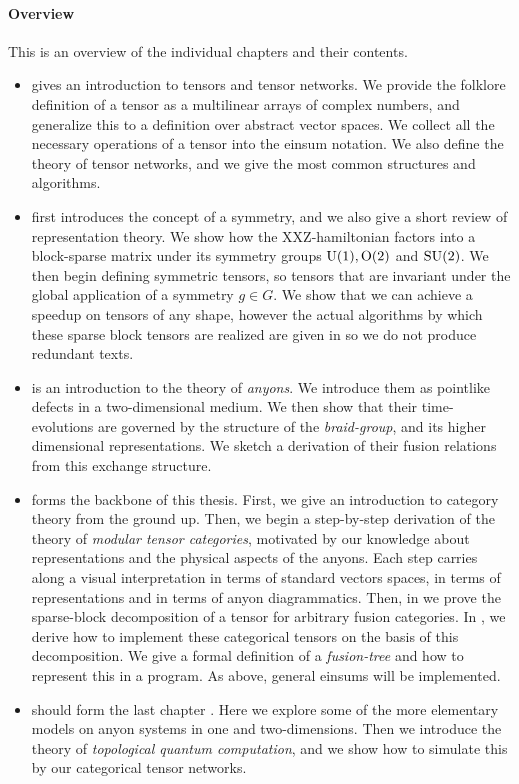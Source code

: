 \paragraph{Overview} This is an overview of the individual chapters and their contents.

\begin{itemize}
    \item {} gives an introduction to tensors and tensor
    networks. We provide the folklore definition of a tensor as a multilinear
    arrays of complex numbers, and generalize this to a definition over abstract
    vector spaces. We collect all the necessary operations of a tensor into the
    einsum notation. We also define the theory of tensor networks, and we give
    the most common structures and algorithms.
    \item {} first introduces the concept of a
    symmetry, and we also give a short review of representation theory. We show
    how the XXZ-hamiltonian factors into a block-sparse matrix under its
    symmetry groups $\mathrm{U}(1),\operatorname{O}(2)$ and $\mathrm{SU}(2)$. We then begin
    defining symmetric tensors, so tensors that are invariant under the global
    application of a symmetry $g \in G$. We show that we can achieve a speedup
    on tensors of any shape, however the actual algorithms by which these sparse
    block tensors are realized are given in  so we do not produce redundant texts.
    \item {} is an introduction to the theory of
    \emph{anyons}. We introduce them as pointlike defects in a two-dimensional
    medium. We then show that their time-evolutions are governed by the
    structure of the \emph{braid-group}, and its higher dimensional
    representations. We sketch a derivation of their fusion relations from this
    exchange structure. 
    \item {} forms the backbone of this thesis. First, we
    give an introduction to category theory from the ground up. Then, we begin a
    step-by-step derivation of the theory of \emph{modular tensor categories},
    motivated by our knowledge about representations and the physical aspects of
    the anyons. Each step carries along a visual interpretation in terms of
    standard vectors spaces, in terms of representations and in terms of anyon
    diagrammatics. Then, in  we prove
    the sparse-block decomposition of a tensor for arbitrary fusion categories.
    In , we derive how to implement these categorical tensors on the
    basis of this decomposition. We give a formal definition of a
    \emph{fusion-tree} and how to represent this in a program. As above, general
    einsums will be implemented.
    \item {} should form the last chapter . Here
    we explore some of the more elementary models on anyon systems in one and
    two-dimensions. Then we introduce the theory of \emph{topological quantum
    computation}, and we show how to simulate this by our categorical tensor
    networks.
\end{itemize}

